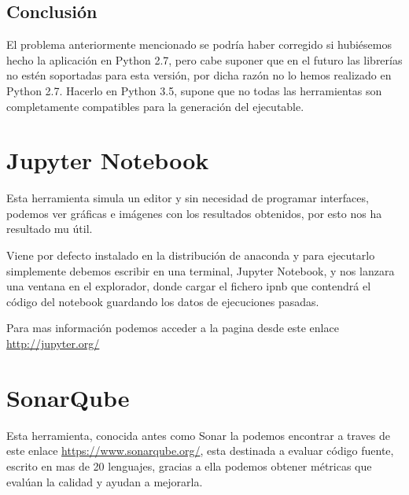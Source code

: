 \subsection{Conclusión}
El problema anteriormente mencionado se podría haber corregido si hubiésemos hecho la aplicación en Python 2.7, pero cabe suponer que en el futuro las librerías no estén soportadas para esta versión, por dicha razón no lo hemos realizado en Python 2.7.
Hacerlo en Python 3.5, supone que no todas las herramientas son completamente compatibles para la generación del ejecutable.

\section{Jupyter Notebook}
\label{notebook:jupiter}

Esta herramienta simula un editor y sin necesidad de programar interfaces, podemos ver gráficas e imágenes con los resultados obtenidos, por esto nos ha resultado mu útil.

Viene por defecto instalado en la distribución de anaconda y para ejecutarlo simplemente debemos escribir en una terminal, Jupyter Notebook, y nos lanzara una ventana en el explorador, donde cargar el fichero ipnb que contendrá el código del notebook guardando los datos de ejecuciones pasadas.


Para mas información podemos acceder a la pagina desde este enlace \url{http://jupyter.org/}

\section{SonarQube}
Esta herramienta, conocida antes como Sonar la podemos encontrar a traves de este enlace \url{https://www.sonarqube.org/}, esta destinada a evaluar código fuente, escrito en mas de 20 lenguajes, gracias a ella podemos obtener métricas que evalúan la calidad y ayudan a mejorarla.


